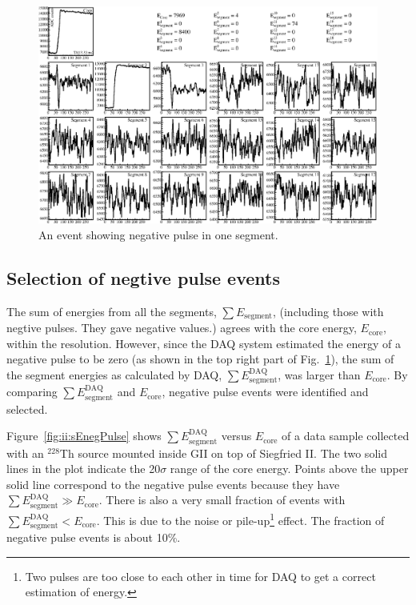 \begin{figure}
\centering
\includegraphics{npul}
\caption{An event showing negative pulse in one segment.}
\label{fig:ii:npul}
\end{figure}

\subsection{Selection of negtive pulse events}
\label{sec:ii:frac}
The sum of energies from all the segments, $\sum E_{\text{segment}}$, (including those with negtive pulses. They gave negative values.) agrees with the core energy, $E_{\text{core}}$, within the resolution. However, since the DAQ system estimated the energy of a negative pulse to be zero (as shown in the top right part of Fig.~\ref{fig:ii:npul}), the sum of the segment energies as calculated by DAQ, $\sum E^{\text{DAQ}}_{\text{segment}}$, was larger than $E_{\text{core}}$. By comparing  $\sum E^{\text{DAQ}}_{\text{segment}}$ and $E_{\text{core}}$, negative pulse events were identified and selected.

Figure~\ref{fig:ii:sEnegPulse} shows $\sum E^{\text{DAQ}}_{\text{segment}}$ versus $E_{\text{core}}$ of a data sample collected with an $^{228}$Th source mounted inside GII on top of Siegfried II. The two solid lines in the plot indicate the 20$\sigma$ range of the core energy. Points above the upper solid line correspond to the negative pulse events because they have $\sum E^{\text{DAQ}}_{\text{segment}} \gg E_{\text{core}}$. There is also a very small fraction of events with$\sum E^{\text{DAQ}}_{\text{segment}} < E_{\text{core}}$. This is due to the noise or pile-up\footnote{Two pulses are too close to each other in time for DAQ to get a correct estimation of energy.} effect. The fraction of negative pulse events is about 10\%.

